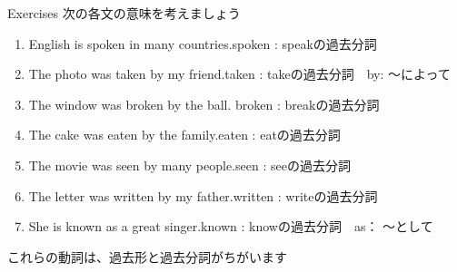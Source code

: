 \documentclass[aspectratio=169,xcolor={dvipsnames,table}]{beamer}
\newcommand{\myaudio}[1]{\href{#1}{\faVolumeUp}}
\begin{document}
\begin{frame}[plain]{Exercises}
 次の各文の意味を考えましょう\hfill{\scriptsize \myaudio{./audio/051_passive_03.mp3}}


 \begin{enumerate}
\item English is spoken in many countries.\hfill{}{\scriptsize spoken  : speakの過去分詞}
\item The photo was taken by my friend.\hfill{}{\scriptsize taken  : takeの過去分詞　by: 〜によって}
\item The window was broken by the ball.\hfill{} {\scriptsize broken  : breakの過去分詞}
\item The cake was eaten by the family.\hfill{}{\scriptsize eaten  : eatの過去分詞}
\item The movie was seen by many people.\hfill{}{\scriptsize seen  : seeの過去分詞}
\item The letter was written by my father.\hfill{}{\scriptsize written  : writeの過去分詞}
\item She is known as a great singer.\hfill{}{\scriptsize known  : knowの過去分詞　as： 〜として}
\end{enumerate}

\pause

\hfill{}{\small これらの動詞は、過去形と過去分詞がちがいます}

\end{frame}
\end{document}
